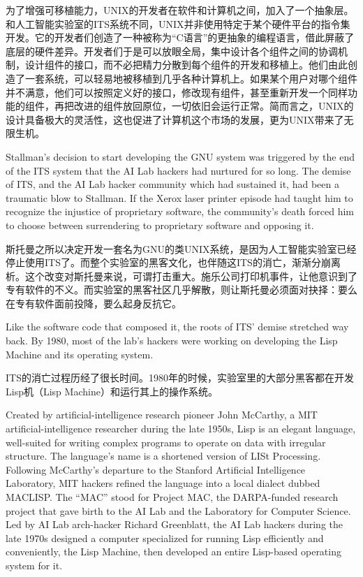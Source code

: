 \ifdefined\chs
为了增强可移植能力，UNIX的开发者在软件和计算机之间，加入了一个抽象层。和人工智能实验室的ITS系统不同，UNIX并非使用特定于某个硬件平台的指令集开发。它的开发者们创造了一种被称为``C语言''的更抽象的编程语言，借此屏蔽了底层的硬件差异。开发者们于是可以放眼全局，集中设计各个组件之间的协调机制，设计组件的接口，而不必把精力分散到每个组件的开发和移植上。他们由此创造了一套系统，可以轻易地被移植到几乎各种计算机上。如果某个用户对哪个组件并不满意，他们可以按照定义好的接口，修改现有组件，甚至重新开发一个同样功能的组件，再把改进的组件放回原位，一切依旧会运行正常。简而言之，UNIX的设计具备极大的灵活性，这也促进了计算机这个市场的发展，更为UNIX带来了无限生机。
\fi

\ifdefined\eng
Stallman's decision to start developing the GNU system was triggered by the end of the ITS system that the AI Lab hackers had nurtured for so long. The demise of ITS, and the AI Lab hacker community which had sustained it, had been a traumatic blow to Stallman. If the Xerox laser printer episode had taught him to recognize the injustice of proprietary software, the community's death forced him to choose between surrendering to proprietary software and opposing it.
\fi

\ifdefined\chs
斯托曼之所以决定开发一套名为GNU的类UNIX系统，是因为人工智能实验室已经停止使用ITS了。而整个实验室的黑客文化，也伴随这ITS的消亡，渐渐分崩离析。这个改变对斯托曼来说，可谓打击重大。施乐公司打印机事件，让他意识到了专有软件的不义。而实验室的黑客社区几乎解散，则让斯托曼必须面对抉择：要么在专有软件面前投降，要么起身反抗它。
\fi

\ifdefined\eng
Like the software code that composed it, the roots of ITS' demise stretched way back.  By 1980, most of the lab's hackers were working on developing the Lisp Machine and its operating system.
\fi

\ifdefined\chs
ITS的消亡过程历经了很长时间。1980年的时候，实验室里的大部分黑客都在开发Lisp机（Lisp Machine）和运行其上的操作系统。
\fi

\ifdefined\eng
Created by artificial-intelligence research pioneer John McCarthy, a MIT artificial-intelligence researcher during the late 1950s, Lisp is an elegant language, well-suited for writing complex programs to operate on data with irregular structure. The language's name is a shortened version of LISt Processing. Following McCarthy's departure to the Stanford Artificial Intelligence Laboratory, MIT hackers refined the language into a local dialect dubbed MACLISP. The ``MAC'' stood for Project MAC, the DARPA-funded research project that gave birth to the AI Lab and the Laboratory for Computer Science. Led by AI Lab arch-hacker Richard Greenblatt, the AI Lab hackers during the late 1970s designed a computer specialized for running Lisp efficiently and conveniently, the Lisp Machine, then developed an entire Lisp-based operating system for it.
\fi


